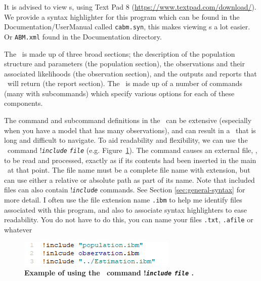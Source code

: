 It is advised to view \config s, using Text Pad 8 (\url{https://www.textpad.com/download/}). We provide a syntax highlighter for this program which can be found in the Documentation/UserManual called \texttt{cabm.syn}, this makes viewing \config s a lot easier. Or \texttt{ABM.xml} found in the Documentation directory.


The \config\ is made up of three broad sections; the description of the population structure and parameters (the population section), the observations and their associated likelihoods (the observation section), and the outputs and reports that \IBM\ will return (the report section). The \config\ is made up of a number of commands (many with subcommands) which specify various options for each of these components.

The command and subcommand definitions in the \config\ can be extensive (especially when you have a model that has many observations), and can result in a \config\ that is long and difficult to navigate. To aid readability and flexibility, we can use the \config\ command !\texttt{\emph{include}} \texttt{\emph{file}}  (e.g. Figure~\ref{fig:config_file_1}). The command causes an external file, , to be read and processed, exactly as if its contents had been inserted in the main \config\ at that point. The file name must be a complete file name with extension, but can use either a relative or absolute path as part of its name. Note that included files can also contain !\texttt{\emph{include}} commands. See Section \ref{sec:general-syntax} for more detail. I often use the file extension name \texttt{.ibm} to help me identify files associated with this program, and also to associate syntax highlighters to ease readability. You do not have to do this, you can name your files \texttt{.txt}, \texttt{.afile} or whatever


\vspace*{3mm}
\begin{figure}[H]
	\includegraphics[scale=1]{Figures/config.png}
	\caption{\textbf{Example of using the \config\ command !\texttt{\emph{include}}
			\texttt{\emph{file}} .}}\label{fig:config_file_1}
\end{figure}

\subsection{\label{sec:redirecting-stdout}}

